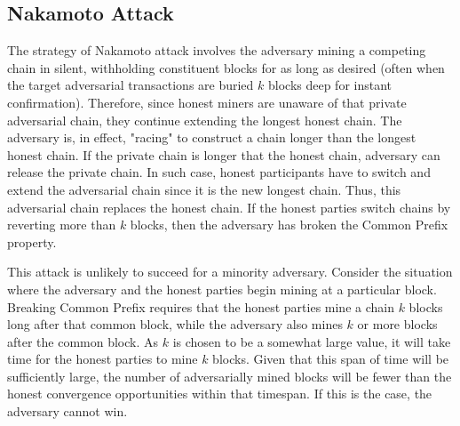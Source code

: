 \subsection{Nakamoto Attack}
The strategy of Nakamoto attack involves the adversary mining a competing chain in silent, withholding constituent blocks for as long as desired (often when the target adversarial transactions are buried $k$ blocks deep for instant confirmation). Therefore, since honest miners are unaware of that private adversarial chain, they continue extending the longest honest chain.
The adversary is, in effect, "racing" to construct a chain longer than the longest honest chain. If the private chain is longer that the honest chain, adversary can release the private chain. In such case, honest participants have to switch and extend the adversarial chain since it is the new longest chain. Thus, this adversarial chain replaces the honest chain. If the honest parties switch chains by reverting more than $k$ blocks, then the adversary has broken the Common Prefix property.

This attack is unlikely to succeed for a minority adversary. Consider the situation where the adversary and the honest parties begin mining at a particular block. Breaking Common Prefix requires that the honest parties mine a chain $k$ blocks long after that common block, while the adversary also mines $k$ or more blocks after the common block. As $k$ is chosen to be a somewhat large value, it will take time for the honest parties to mine $k$ blocks. Given that this span of time will be sufficiently large, the number of adversarially mined blocks will be fewer than the honest convergence opportunities within that timespan. If this is the case, the adversary cannot win.

